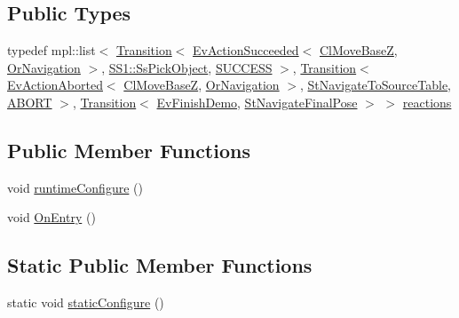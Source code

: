 \subsection*{Public Types}
\begin{DoxyCompactItemize}
\item 
typedef mpl\+::list$<$ \hyperlink{classsmacc_1_1Transition}{Transition}$<$ \hyperlink{structsmacc_1_1default__events_1_1EvActionSucceeded}{Ev\+Action\+Succeeded}$<$ \hyperlink{classcl__move__base__z_1_1ClMoveBaseZ}{Cl\+Move\+BaseZ}, \hyperlink{classsm__fetch__six__table__pick__n__sort__1_1_1OrNavigation}{Or\+Navigation} $>$, \hyperlink{structsm__fetch__six__table__pick__n__sort__1_1_1SS1_1_1SsPickObject}{S\+S1\+::\+Ss\+Pick\+Object}, \hyperlink{structsmacc_1_1default__transition__tags_1_1SUCCESS}{S\+U\+C\+C\+E\+SS} $>$, \hyperlink{classsmacc_1_1Transition}{Transition}$<$ \hyperlink{structsmacc_1_1default__events_1_1EvActionAborted}{Ev\+Action\+Aborted}$<$ \hyperlink{classcl__move__base__z_1_1ClMoveBaseZ}{Cl\+Move\+BaseZ}, \hyperlink{classsm__fetch__six__table__pick__n__sort__1_1_1OrNavigation}{Or\+Navigation} $>$, \hyperlink{structsm__fetch__six__table__pick__n__sort__1_1_1StNavigateToSourceTable}{St\+Navigate\+To\+Source\+Table}, \hyperlink{structsmacc_1_1default__transition__tags_1_1ABORT}{A\+B\+O\+RT} $>$, \hyperlink{classsmacc_1_1Transition}{Transition}$<$ \hyperlink{structsm__fetch__six__table__pick__n__sort__1_1_1EvFinishDemo}{Ev\+Finish\+Demo}, \hyperlink{structsm__fetch__six__table__pick__n__sort__1_1_1StNavigateFinalPose}{St\+Navigate\+Final\+Pose} $>$ $>$ \hyperlink{structsm__fetch__six__table__pick__n__sort__1_1_1StNavigateToSourceTable_a9cecc0b1d0a924176908b3e32eb3d2e9}{reactions}
\end{DoxyCompactItemize}
\subsection*{Public Member Functions}
\begin{DoxyCompactItemize}
\item 
void \hyperlink{structsm__fetch__six__table__pick__n__sort__1_1_1StNavigateToSourceTable_a1e4b8cd70fbb88d5c42ebfdc48a9122f}{runtime\+Configure} ()
\item 
void \hyperlink{structsm__fetch__six__table__pick__n__sort__1_1_1StNavigateToSourceTable_aff505f7bdc92511e1fce3c703c7165a4}{On\+Entry} ()
\end{DoxyCompactItemize}
\subsection*{Static Public Member Functions}
\begin{DoxyCompactItemize}
\item 
static void \hyperlink{structsm__fetch__six__table__pick__n__sort__1_1_1StNavigateToSourceTable_a836a8ec737b708629633afb0655b3920}{static\+Configure} ()
\end{DoxyCompactItemize}
